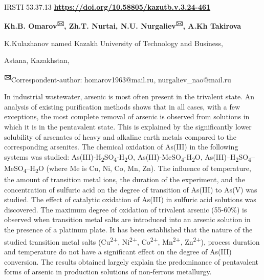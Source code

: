 \newpage
IRSTI 53.37.13
\hfill {\bfseries \href{https://doi.org/10.58805/kazutb.v.3.24-461}{https://doi.org/10.58805/kazutb.v.3.24-461}}


\begin{center}
{\bfseries Kh.B. Omarov\textsuperscript{🖂}, Zh.T. Nurtai, N.U.
Nurgaliev\textsuperscript{🖂}, A.Kh Takirova}

K.Kulazhanov named Kazakh University of Technology and Business,

Astana, Kazakhstan,
\end{center}

{\bfseries \textsuperscript{🖂}}Correspondent-author: homarov1963@mail.ru,
nurgaliev\_nao@mail.ru

In industrial wastewater, arsenic is most often present in the trivalent
state. An analysis of existing purification methods shows that in all
cases, with a few exceptions, the most complete removal of arsenic is
observed from solutions in which it is in the pentavalent state. This is
explained by the significantly lower solubility of arsenates of heavy
and alkaline earth metals compared to the corresponding arsenites. The
chemical oxidation of As(III) in the following systems was studied:
As(III)-H\textsubscript{2}SO\textsubscript{4}-H\textsubscript{2}O,
As(III)-MeSO\textsubscript{4}-H\textsubscript{2}O,
As(III)--H\textsubscript{2}SO\textsubscript{4}--MeSO\textsubscript{4}--H\textsubscript{2}O
(where Me is Cu, Ni, Co, Mn, Zn). The influence of temperature, the
amount of transition metal ions, the duration of the experiment, and the
concentration of sulfuric acid on the degree of transition of As(III) to
As(V) was studied. The effect of catalytic oxidation of As(III) in
sulfuric acid solutions was discovered. The maximum degree of oxidation
of trivalent arsenic (55-60\%) is observed when transition metal salts
are introduced into an arsenic solution in the presence of a platinum
plate. It has been established that the nature of the studied transition
metal salts (Cu\textsuperscript{2+}, Ni\textsuperscript{2+},
Co\textsuperscript{2+}, Mn\textsuperscript{2+}, Zn\textsuperscript{2+}),
process duration and temperature do not have a significant effect on the
degree of As(III) conversion. The results obtained largely explain the
predominance of pentavalent forms of arsenic in production solutions of
non-ferrous metallurgy.

